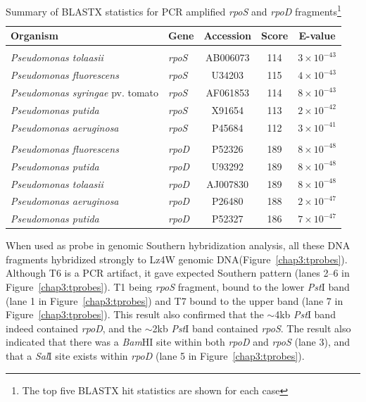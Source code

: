 \begin{table}[tbp]
\begin{minipage}[c]{\textwidth}
\renewcommand{\footnoterule}{}
\caption[Summary of BLASTX statistics for PCR amplified
\emph{rpoD} and \emph{rpoS} fragments]{Summary of BLASTX
statistics for PCR amplified \emph{rpoS} and \emph{rpoD}
fragments\protect\footnote{The top five BLASTX hit statistics are
shown for each case}} \label{chap3:blast_summary} \centering
\begin{small}
\begin{tabular}{llccc}\toprule
\textbf{Organism} & \textbf{Gene} & \textbf{Accession} &
\textbf{Score} & \textbf{E-value}\\\midrule\addlinespace
\multicolumn{5}{l}{\textbf{Fragment T1}}\\ \emph{Pseudomonas
tolaasii} & \emph{rpoS} & AB006073 & 114 & $3
\times{}10^{-43}$ \\
\emph{Pseudomonas fluorescens} & \emph{rpoS} & U34203 & 115 &
$4\times{}10^{-43}$ \\
\emph{Pseudomonas syringae} pv. tomato & \emph{rpoS} & AF061853 &
114  & $8\times{}10^{-43}$ \\
\emph{Pseudomonas putida}& \emph{rpoS} & X91654 &
113 & $2\times{}10^{-42}$\\
\emph{Pseudomonas aeruginosa} & \emph{rpoS} & P45684 & 112 &
$3\times{}10^{-41}$\\\addlinespace \multicolumn{5}{l}{\textbf{Fragment T7}}\\
\emph{Pseudomonas fluorescens} & \emph{rpoD} & P52326 & 189 &
$8\times{}10^{-48}$ \\
\emph{Pseudomonas putida} & \emph{rpoD} & U93292 &  189 &
$8\times{}10^{-48}$ \\
\emph{Pseudomonas tolaasii} & \emph{rpoD} &AJ007830 &  189 &
$8\times{}10^{-48}$ \\
\emph{Pseudomonas aeruginosa} & \emph{rpoD} & P26480 &  188 & $2\times{}10^{-47}$ \\
\emph{Pseudomonas putida} & \emph{rpoD} & P52327 &  186 &
$7\times{}10^{-47}$ \\
\bottomrule
\end{tabular}
\end{small}
\end{minipage}
\end{table}

When used as probe in genomic Southern hybridization analysis, all
these DNA fragments hybridized strongly to Lz4W genomic
DNA(Figure~\ref{chap3:tprobes}). Although T6 is a PCR artifact, it
gave expected Southern pattern (lanes 2--6 in
Figure~\ref{chap3:tprobes}). T1 being \emph{rpoS} fragment, bound
to the lower \emph{Pst}I band (lane 1 in
Figure~\ref{chap3:tprobes}) and T7 bound to the upper band (lane 7
in Figure~\ref{chap3:tprobes}). This result also confirmed that
the \U{$\sim$4}{kb} \emph{Pst}I band indeed contained \emph{rpoD},
and the \U{$\sim$2}{kb} \emph{Pst}I band contained \emph{rpoS}.
The result also indicated that there was a \emph{Bam}HI site
within both \emph{rpoD} and \emph{rpoS} (lane 3), and that  a
\emph{Sal}I site exists within \emph{rpoD} (lane 5 in
Figure~\ref{chap3:tprobes}).

